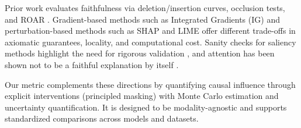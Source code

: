 Prior work evaluates faithfulness via deletion/insertion curves, occlusion tests, and ROAR \citep{hooker2019roar}. Gradient-based methods such as Integrated Gradients (IG) \citep{sundararajan2017integrated} and perturbation-based methods such as SHAP \citep{lundberg2017shap} and LIME \citep{ribeiro2016lime} offer different trade-offs in axiomatic guarantees, locality, and computational cost. Sanity checks for saliency methods highlight the need for rigorous validation \citep{adebayo2018sanity}, and attention has been shown not to be a faithful explanation by itself \citep{jain2019attention}.

Our metric complements these directions by quantifying causal influence through explicit interventions (principled masking) with Monte Carlo estimation and uncertainty quantification. It is designed to be modality-agnostic and supports standardized comparisons across models and datasets.

